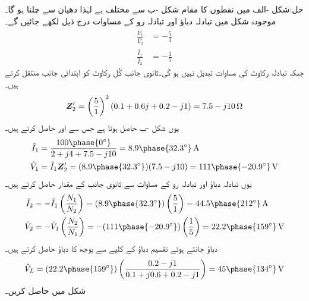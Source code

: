 حل:شکل -الف میں نقطوں کا مقام شکل -ب سے مختلف ہے لہٰذا دھیان سے چلنا ہو گا۔موجودہ شکل میں تبادلہ دباؤ اور تبادلہ رو کے مساوات درج ذیل لکھے جائیں گے۔
\begin{align*}
\frac{\hat{V}_1}{\hat{V}_2}&=-\frac{5}{1}\\
\frac{\hat{I}_1}{\hat{I}_2}&=-\frac{1}{5}
\end{align*}
جبکہ تبادلہ رکاوٹ کی مساوات تبدیل نہیں ہو گی۔ثانوی جانب کُل رکاوٹ کو ابتدائی جانب منتقل کرتے ہیں۔
\begin{align*}
{\ensuremath{{\boldsymbol{Z}}}}_2'=\left(\frac{5}{1}\right)^2 (0.1+0.6j+0.2-j1)=7.5-j10\,\si{\ohm}
\end{align*} 
یوں شکل -ب حاصل ہوتا ہے جس سے  اور  حاصل کرتے ہیں۔
\begin{align*}
\hat{I}_1&=\frac{100\phase{0^{\circ}}}{2+j4+7.5-j10}=8.9\phase{32.3^{\circ}}\,\si{\ampere}\\
\hat{V}_1&=\hat{I}_1 \bZ_2'=(8.9\phase{32.3^{\circ}})(7.5-j10)=111\phase{-20.9^{\circ}}\,\si{\volt}
\end{align*}
یوں تبادلہ دباؤ اور تبادلہ رو کے مساوات سے ثانوی جانب کے مقدار حاصل کرتے ہیں۔
\begin{align*}
\hat{I}_2&=-\hat{I}_1\left(\frac{N_1}{N_2}\right)=(8.9\phase{32.3^{\circ}})\left(\frac{5}{1}\right)=44.5\phase{212^{\circ}}\,\si{\ampere}\\
\hat{V}_2&=-\hat{V}_1\left(\frac{N_2}{N_1}\right)=-(111\phase{-20.9^{\circ}})\left(\frac{1}{5}\right)=22.2\phase{159^{\circ}}\,\si{\volt}
\end{align*}
دباؤ  جانتے ہوئے تقسیم دباؤ کے کلیے سے بوجھ کا دباؤ حاصل کرتے ہیں۔
\begin{align*}
\hat{V}_L=(22.2\phase{159^{\circ}}) \left(\frac{0.2-j1}{0.1+j0.6+0.2-j1}\right)=45\phase{134^{\circ}}\,\si{\volt}
\end{align*}
شکل  میں  حاصل کریں۔
